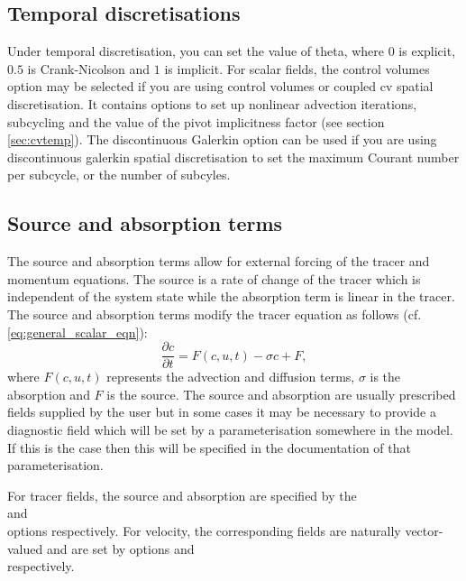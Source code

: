 \subsection{Temporal discretisations}
\label{sec:configuring_fluidity_temporal_discretisation}
Under temporal discretisation, you can set the value of theta, where $0$ is explicit, $0.5$ is Crank-Nicolson and $1$ is implicit. For scalar fields, the control volumes option may be selected if you are using control volumes or coupled cv spatial discretisation.  It contains options to set up nonlinear advection iterations, subcycling and the value of the pivot implicitness factor (see section \ref{sec:cvtemp}). The discontinuous Galerkin option can be used if you are using discontinuous galerkin spatial discretisation to set the maximum Courant number per subcycle, or the number of subcyles.

\subsection{Source and absorption terms}\label{sec:Source}

The source and absorption terms allow for external forcing of the tracer and
momentum equations. The source is a rate of change of the tracer which is
independent of the system state while the absorption term is linear in the
tracer. The source and absorption terms modify the tracer
equation as follows (cf. \eqref{eq:general_scalar_eqn}):
\begin{equation}
  \frac{\partial c}{\partial t} = F(c,u,t) - \sigma c + F,
\end{equation}
where $F(c,u,t)$ represents the advection and diffusion terms, $\sigma$ is the
absorption and $F$ is the source. The source and absorption are usually
prescribed fields supplied by the user but in some cases it may be necessary
to provide a diagnostic field which will be set by a parameterisation
somewhere in the model. If this is the case then this will be specified in
the documentation of that parameterisation.

For tracer fields, the source and absorption are specified by the\onlypdf\\
 and\onlypdf\\
 options
respectively. For velocity, the corresponding fields are naturally
vector-valued and are set by options\onlypdf\linebreak
{} and\onlypdf\\
respectively.

